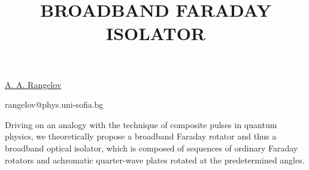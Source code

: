 \title{BROADBAND FARADAY ISOLATOR}

\underline{A. A. Rangelov}


{\normalsize{

\vspace{-4mm} \unisofia

\email rangelov@phys.uni-sofia.bg}}

Driving on an analogy with the technique of composite pulses in quantum
physics, we theoretically propose a broadband Faraday rotator and thus a broadband optical
isolator, which is composed of sequences of ordinary Faraday rotators and
achromatic quarter-wave plates rotated at the predetermined angles.

\vspace{\baselineskip}
